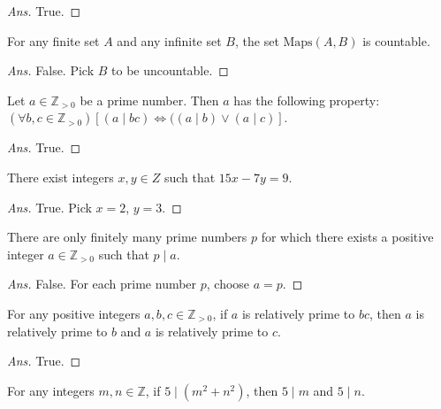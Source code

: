 \documentclass[12pt]{article}
\newenvironment{problem}[2][Problem]{\begin{trivlist}
\item[\hskip \labelsep {\bfseries #1}\hskip \labelsep {\bfseries #2.}]}{\end{trivlist}}
\begin{document}
\begin{proof}[Ans]
True.
\end{proof}

\begin{problem}{23}
For any finite set $A$ and any infinite set $B$,
the set $\text{Maps}(A, B)$ is countable.
\end{problem}

\begin{proof}[Ans]
False. Pick $B$ to be uncountable.
\end{proof}

\begin{problem}{24}
Let $a \in \mathbb{Z}_{>0}$ be a prime number. Then $a$ has the following property:
$(\forall b, c \in \mathbb{Z}_{>0})\left[(a \mid bc) 
\Leftrightarrow ((a \mid b) \lor (a \mid c) \right]$.

\end{problem}

\begin{proof}[Ans]
True. 
\end{proof}

\begin{problem}{25}
There exist integers $x, y \in Z$ such that $15x - 7y = 9$.
\end{problem}

\begin{proof}[Ans]
True. Pick $x = 2$, $y = 3$.
\end{proof}

\begin{problem}{26}
There are only finitely many prime numbers $p$ for which
there exists a positive integer $a \in \mathbb{Z}_{>0}$ such that $p \mid a$.
\end{problem}

\begin{proof}[Ans]
False. For each prime number $p$, choose $a = p$.
\end{proof}

\begin{problem}{27}
For any positive integers $a, b, c \in \mathbb{Z}_{>0}$, if $a$ is relatively prime to $bc$,
then $a$ is relatively prime to $b$ and $a$ is relatively prime to $c$.

\end{problem}

\begin{proof}[Ans]
True.
\end{proof}

\begin{problem}{28}
For any integers $m, n \in \mathbb{Z}$, if $5 \mid (m^2+n^2)$, then $5 \mid m$ and $5 \mid n$.

\end{problem}
\end{document}
